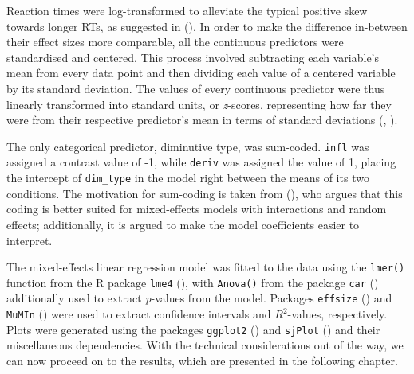 Reaction times were log-transformed to alleviate the typical positive skew towards longer RTs, as suggested in \citeauthor{Winter+2019} (\citeyear{Winter+2019}). In order to make the difference in-between their effect sizes more comparable, all the continuous predictors were standardised and centered. This process involved subtracting each variable's mean from every data point and then dividing each value of a centered variable by its standard deviation. The values of every continuous predictor were thus linearly transformed into standard units, or \textit{z}-scores, representing how far they were from their respective predictor's mean in terms of standard deviations (\citeauthor{Winter+2019}, \citeyear{Winter+2019}). 

The only categorical predictor, diminutive type, was sum-coded. \texttt{infl} was assigned a contrast value of -1, while \texttt{deriv} was assigned the value of 1, placing the intercept of \texttt{dim\_type} in the model right between the means of its two conditions. The motivation for sum-coding is taken from \citeauthor{Winter+2019} (\citeyear{Winter+2019}), who argues that this coding is better suited for mixed-effects models with interactions and random effects; additionally, it is argued to make the model coefficients easier to interpret.

The mixed-effects linear regression model was fitted to the data using the \texttt{lmer()} function from the R package \texttt{lme4} (\cite{lme4+2015}), with \texttt{Anova()} from the package \texttt{car} (\cite{car+2019}) additionally used to extract \textit{p}-values from the model. Packages \texttt{effsize} (\cite{effsize+2020}) and \texttt{MuMIn} (\cite{MuMIn+2022}) were used to extract confidence intervals and $R^2$-values, respectively. Plots were generated using the packages \texttt{ggplot2} (\cite{ggplot2+2016}) and \texttt{sjPlot} (\cite{sjplot+2022}) and their miscellaneous dependencies. With the technical considerations out of the way, we can now proceed on to the results, which are presented in the following chapter.